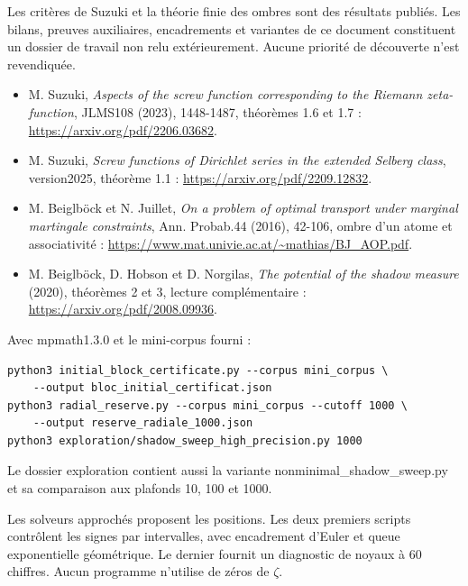 \documentclass[
  10pt,
  a4paper,
]{article}
\providecommand{\tightlist}{%
  \setlength{\itemsep}{0pt}\setlength{\parskip}{0pt}}
\begin{document}
Les critères de Suzuki et la théorie finie des ombres sont des résultats
publiés. Les bilans, preuves auxiliaires, encadrements et variantes de
ce document constituent un dossier de travail non relu extérieurement.
Aucune priorité de découverte n'est revendiquée.

\begin{itemize}
\tightlist
\item
  M. Suzuki, \emph{Aspects of the screw function corresponding to the
  Riemann zeta-function}, JLMS108 (2023), 1448-1487, théorèmes 1.6 et
  1.7 : \url{https://arxiv.org/pdf/2206.03682}.
\item
  M. Suzuki, \emph{Screw functions of Dirichlet series in the extended
  Selberg class}, version2025, théorème 1.1 :
  \url{https://arxiv.org/pdf/2209.12832}.
\item
  M. Beiglböck et N. Juillet, \emph{On a problem of optimal transport
  under marginal martingale constraints}, Ann. Probab.44 (2016), 42-106,
  ombre d'un atome et associativité :
  \url{https://www.mat.univie.ac.at/~mathias/BJ_AOP.pdf}.
\item
  M. Beiglböck, D. Hobson et D. Norgilas, \emph{The potential of the
  shadow measure} (2020), théorèmes 2 et 3, lecture complémentaire :
  \url{https://arxiv.org/pdf/2008.09936}.
\end{itemize}

Avec mpmath1.3.0 et le mini-corpus fourni :

\begin{verbatim}
python3 initial_block_certificate.py --corpus mini_corpus \
    --output bloc_initial_certificat.json
python3 radial_reserve.py --corpus mini_corpus --cutoff 1000 \
    --output reserve_radiale_1000.json
python3 exploration/shadow_sweep_high_precision.py 1000
\end{verbatim}

Le dossier exploration contient aussi la variante
nonminimal\_shadow\_sweep.py et sa comparaison aux plafonds 10, 100 et
1000.

Les solveurs approchés proposent les positions. Les deux premiers
scripts contrôlent les signes par intervalles, avec encadrement d'Euler
et queue exponentielle géométrique. Le dernier fournit un diagnostic de
noyaux à 60 chiffres. Aucun programme n'utilise de zéros de \(\zeta\).
\end{document}
